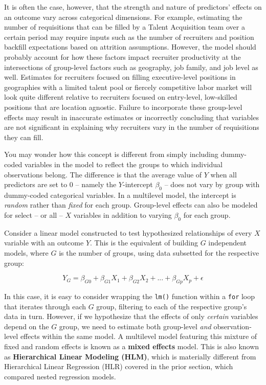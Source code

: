 \documentclass[
]{book}
\begin{document}
It is often the case, however, that the strength and nature of predictors' effects on an outcome vary across categorical dimensions. For example, estimating the number of requisitions that can be filled by a Talent Acquisition team over a certain period may require inputs such as the number of recruiters and position backfill expectations based on attrition assumptions. However, the model should probably account for how these factors impact recruiter productivity at the intersections of group-level factors such as geography, job family, and job level as well. Estimates for recruiters focused on filling executive-level positions in geographies with a limited talent pool or fiercely competitive labor market will look quite different relative to recruiters focused on entry-level, low-skilled positions that are location agnostic. Failure to incorporate these group-level effects may result in inaccurate estimates or incorrectly concluding that variables are not significant in explaining why recruiters vary in the number of requisitions they can fill.

You may wonder how this concept is different from simply including dummy-coded variables in the model to reflect the groups to which individual observations belong. The difference is that the average value of \(Y\) when all predictors are set to 0 -- namely the \(Y\)-intercept \(\beta_0\) -- does not vary by group with dummy-coded categorical variables. In a multilevel model, the intercept is \emph{random} rather than \emph{fixed} for each group. Group-level effects can also be modeled for select -- or all -- \(X\) variables in addition to varying \(\beta_0\) for each group.

Consider a linear model constructed to test hypothesized relationships of every \(X\) variable with an outcome \(Y\). This is the equivalent of building \(G\) independent models, where \(G\) is the number of groups, using data subsetted for the respective group:

\[ Y_G = \beta_{G0} + \beta_{G1} X_1 + \beta_{G2} X_2 + {...} + \beta_{Gp} X_p + \epsilon \]

In this case, it is easy to consider wrapping the \texttt{lm()} function within a \texttt{for} loop that iterates through each \(G\) group, filtering to each of the respective group's data in turn. However, if we hypothesize that the effects of only \emph{certain} variables depend on the \(G\) group, we need to estimate both group-level \emph{and} observation-level effects within the same model. A multilevel model featuring this mixture of fixed and random effects is known as a \textbf{mixed effects} model. This is also known as \textbf{Hierarchical Linear Modeling (HLM)}, which is materially different from Hierarchical Linear Regression (HLR) covered in the prior section, which compared nested regression models.
\end{document}

